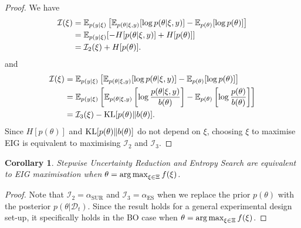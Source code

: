 \documentclass[a4paper, 10pt]{report}
\theoremstyle{plain}
\newtheorem{corollary}[theorem]{Corollary}
\begin{document}
	\begin{proof}
		We have
		\begin{align}
		\mathcal{I}(\xi) &= \mathbb{E}_{p(y|\xi)}\left[ \mathbb{E}_{p(\theta|\xi,y)}[\log p(\theta|\xi,y)]-\mathbb{E}_{p(\theta)}[\log p(\theta)] \right] \\
		&= \mathbb{E}_{p(y|\xi)}[- H[p(\theta|\xi,y)] + H[p(\theta)] ] \\
		&=  \mathcal{I}_2(\xi) + H[p(\theta)].
		\end{align}
		and
		\begin{align}
		\mathcal{I}(\xi) &= \mathbb{E}_{p(y|\xi)}\left[ \mathbb{E}_{p(\theta|\xi,y)}[\log p(\theta|\xi,y)]-\mathbb{E}_{p(\theta)}[\log p(\theta)] \right] \\
		&= 	\mathbb{E}_{p(y|\xi)}\left[ \mathbb{E}_{p(\theta|\xi,y)}\left[\log \frac{p(\theta|\xi,y)}{b(\theta)}\right]-\mathbb{E}_{p(\theta)}\left[\log \frac{p(\theta)}{b(\theta)}\right] \right] \\
		&= \mathcal{I}_3(\xi) - \textup{KL}[p(\theta)\|b(\theta)].
		\end{align}
		Since $H[p(\theta)]$ and $\textup{KL}[p(\theta)\|b(\theta)]$ do not depend on $\xi$, choosing $\xi$ to maximise EIG is equivalent to maximising $\mathcal{I}_2$ and $\mathcal{I}_3$.
	\end{proof}
	
	\begin{corollary}
		Stepwise Uncertainty Reduction \citep{villemonteix2009informational} and Entropy Search \citep{hennig2012entropy} are equivalent to EIG maximisation when $\theta = \operatorname*{arg\,max}_{\xi\in\Xi} f(\xi)$.
	\end{corollary}
	\begin{proof}
		Note that $\mathcal{I}_2 = \alpha_\text{SUR}$ and $\mathcal{I}_3 = \alpha_\text{ES}$ when we replace the prior $p(\theta)$ with the posterior $p(\theta|\mathcal{D}_t)$. 
		Since the result holds for a general experimental design set-up, it specifically holds in the BO case when $\theta = \operatorname*{arg\,max}_{\xi\in\Xi} f(\xi)$.
	\end{proof}
	
\end{document}
